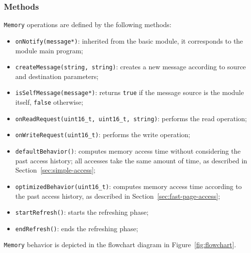 \documentclass[a4paper,12pt]{article}
\begin{document}
\subsubsection{Methods}
\texttt{Memory} operations are defined by the following methods:

\begin{itemize}
    \item \texttt{onNotify(message*)}: inherited from the basic module, it corresponds to the module main program;
    \item \texttt{createMessage(string, string)}: creates a new message according to source and destination parameters;
    \item \texttt{isSelfMessage(message*)}: returns \texttt{true} if the message source is the module itself, \texttt{false} otherwise;
    \item \texttt{onReadRequest(uint16\_t, uint16\_t, string)}: performs the read operation;
    \item \texttt{onWriteRequest(uint16\_t)}: performs the write operation;
    \item \texttt{defaultBehavior()}: computes memory access time without considering the past access history; all accesses take the same amount of time, as described in Section~\ref{sec:simple-access};
    \item \texttt{optimizedBehavior(uint16\_t)}: computes memory access time according to the past access history, as described in Section~\ref{sec:fast-page-access};
    \item \texttt{startRefresh()}: starts the refreshing phase;
    \item \texttt{endRefresh()}: ends the refreshing phase;
\end{itemize}

\texttt{Memory} behavior is depicted in the flowchart diagram in Figure~\ref{fig:flowchart}.
\end{document}
